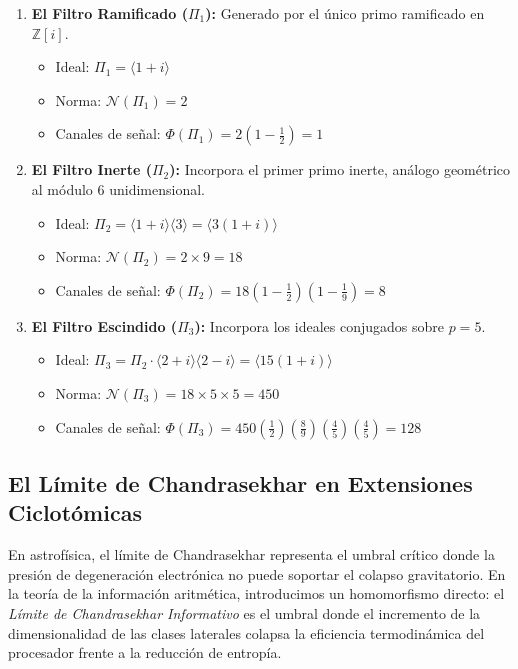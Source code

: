 \documentclass[12pt, a4paper]{article}
\theoremstyle{plain}
\theoremstyle{definition}
\theoremstyle{remark}
\newcommand{\Z}{\mathbb{Z}}
\newcommand{\Norm}{\mathcal{N}}
\begin{document}
\begin{enumerate}[label=\textbf{Nivel \arabic*:}, leftmargin=*]
    \item \textbf{El Filtro Ramificado ($\Pi_1$):} Generado por el único primo ramificado en $\Z[i]$.
    \begin{itemize}
        \item Ideal: $\Pi_1 = \langle 1+i \rangle$
        \item Norma: $\Norm(\Pi_1) = 2$
        \item Canales de señal: $\Phi(\Pi_1) = 2 \left(1 - \frac{1}{2}\right) = 1$
    \end{itemize}
    
    \item \textbf{El Filtro Inerte ($\Pi_2$):} Incorpora el primer primo inerte, análogo geométrico al módulo 6 unidimensional.
    \begin{itemize}
        \item Ideal: $\Pi_2 = \langle 1+i \rangle \langle 3 \rangle = \langle 3(1+i) \rangle$
        \item Norma: $\Norm(\Pi_2) = 2 \times 9 = 18$
        \item Canales de señal: $\Phi(\Pi_2) = 18 \left(1 - \frac{1}{2}\right) \left(1 - \frac{1}{9}\right) = 8$
    \end{itemize}

    \item \textbf{El Filtro Escindido ($\Pi_3$):} Incorpora los ideales conjugados sobre $p=5$.
    \begin{itemize}
        \item Ideal: $\Pi_3 = \Pi_2 \cdot \langle 2+i \rangle \langle 2-i \rangle = \langle 15(1+i) \rangle$
        \item Norma: $\Norm(\Pi_3) = 18 \times 5 \times 5 = 450$
        \item Canales de señal: $\Phi(\Pi_3) = 450 \left(\frac{1}{2}\right) \left(\frac{8}{9}\right) \left(\frac{4}{5}\right) \left(\frac{4}{5}\right) = 128$
    \end{itemize}
\end{enumerate}

\subsection{El Límite de Chandrasekhar en Extensiones Ciclotómicas}

En astrofísica, el límite de Chandrasekhar representa el umbral crítico donde la presión de degeneración electrónica no puede soportar el colapso gravitatorio. En la teoría de la información aritmética, introducimos un homomorfismo directo: el \textit{Límite de Chandrasekhar Informativo} es el umbral donde el incremento de la dimensionalidad de las clases laterales colapsa la eficiencia termodinámica del procesador frente a la reducción de entropía.
\end{document}
